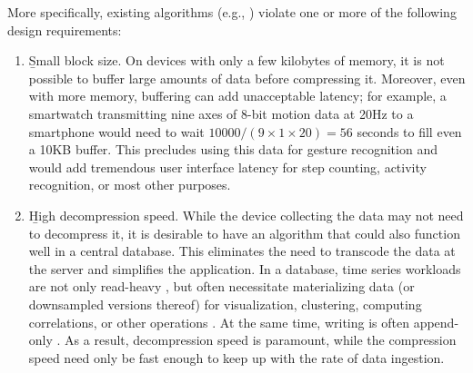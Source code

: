 More specifically, existing algorithms (e.g., \cite{sax, tsCompressSmartGrid, ecgCompressLossy, apca, lz4, zstd, zlib, gzip, lemireSegmentation}) violate one or more of the following design requirements:

\begin{enumerate}
\item \b{Small block size}. On devices with only a few kilobytes of memory, it is not possible to buffer large amounts of data before compressing it. Moreover, even with more memory, buffering can add unacceptable latency; for example, a smartwatch transmitting nine axes of 8-bit motion data at 20Hz to a smartphone would need to wait $10000 / (9 \times 1 \times 20) = 56$ seconds to fill even a 10KB buffer. This precludes using this data for gesture recognition and would add tremendous user interface latency for step counting, activity recognition, or most other purposes.
\item \b{High decompression speed}. While the device collecting the data may not need to decompress it, it is desirable to have an algorithm that could also function well in a central database. This eliminates the need to transcode the data at the server and simplifies the application. In a database, time series workloads are not only read-heavy \cite{respawnDB, berkeleyTreeDB, influxDB}, but often necessitate materializing data (or downsampled versions thereof) for visualization, clustering, computing correlations, or other operations \cite{respawnDB}. At the same time, writing is often append-only \cite{gorilla, respawnDB}. As a result, decompression speed is paramount, while the compression speed need only be fast enough to keep up with the rate of data ingestion.

\end{enumerate}
